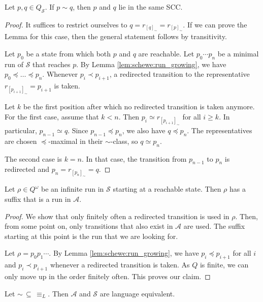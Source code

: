 \begin{lem}
\label{lem:schewe:equiv_same_scc}
	Let $p, q \in Q_\mathcal{S}$. If $p \sim q$, then $p$ and $q$ lie in the same SCC. 
\end{lem}

\begin{proof}
	It suffices to restrict ourselves to $q = r_{[q]_\sim} = r_{[p]_\sim}$. If we can prove the Lemma for this case, then the general statement follows by transitivity.
	
	Let $p_0$ be a state from which both $p$ and $q$ are reachable. Let $p_0 \cdots p_n$ be a minimal run of $\mathcal{S}$ that reaches $p$. By Lemma \ref{lem:schewe:run_growing}, we have $p_0 \preceq \dots \preceq p_n$. Whenever $p_i \prec p_{i+1}$, a redirected transition to the representative $r_{[p_{i+1}]_\sim} = p_{i+1}$ is taken. 
	
	Let $k$ be the first position after which no redirected transition is taken anymore. For the first case, assume that $k < n$. Then $p_i \simeq r_{[p_{i+1}]_\sim}$ for all $i \geq k$. In particular, $p_{n-1} \simeq q$. Since $p_{n-1} \preceq p_n$, we also have $q \preceq p_n$. The representatives are chosen $\preceq$-maximal in their $\sim$-class, so $q \simeq p_n$.
	
	The second case is $k = n$. In that case, the transition from $p_{n-1}$ to $p_n$ is redirected and $p_n = r_{[p_n]_\sim} = q$.
\end{proof}


\begin{lem}
\label{lem:schewe:run_suffix}
	Let $\rho \in Q^\omega$ be an infinite run in $\mathcal{S}$ starting at a reachable state. Then $\rho$ has a suffix that is a run in $\mathcal{A}$.
\end{lem} 

\begin{proof}
	We show that only finitely often a redirected transition is used in $\rho$. Then, from some point on, only transitions that also exist in $\mathcal{A}$ are used. The suffix starting at this point is the run that we are looking for.
	
	Let $\rho = p_0 p_1 \cdots$. By Lemma \ref{lem:schewe:run_growing}, we have $p_i \preceq p_{i+1}$ for all $i$ and $p_i \prec p_{i+1}$ whenever a redirected transition is taken. As $Q$ is finite, we can only move up in the order finitely often. This proves our claim.
\end{proof}


\begin{theorem}
	Let $\sim \,\subseteq\, \equiv_L$. Then $\mathcal{A}$ and $\mathcal{S}$ are language equivalent.
\end{theorem}

